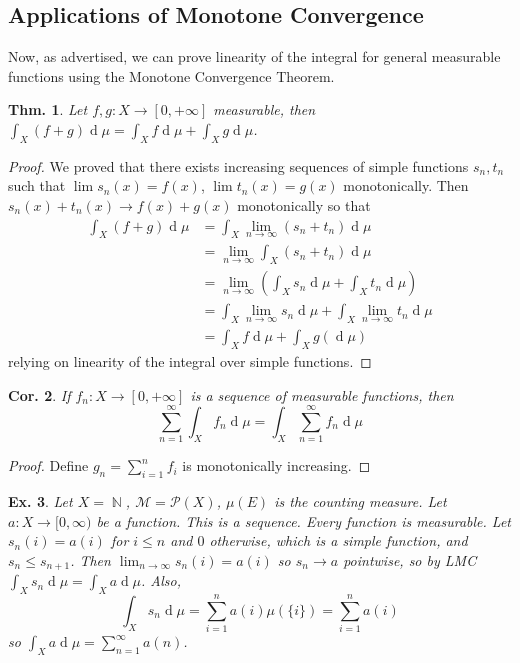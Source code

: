 \documentclass[12pt, a4paper]{book}
\DeclareMathOperator{\N}{\mathbb{N}}
\renewcommand{\d}[1]{\ensuremath{\operatorname{d}\!{#1}}} %
\newtheorem{theorem}{Thm.}[section]
\newtheorem{corollary}[theorem]{Cor.}
\newtheorem{example}[theorem]{Ex.}
\theoremstyle{nonumberplain}
\newtheorem{proof}{Proof}
\begin{document}
\subsection{Applications of Monotone Convergence}
Now, as advertised, we can prove linearity of the integral for general measurable functions using the Monotone Convergence Theorem.
\begin{theorem}
    Let $f,g:X\to[0,+\infty]$ measurable, then $\int_X(f+g)\d{\mu}=\int_X f\d{\mu}+\int_X g\d{\mu}$.
\end{theorem}
\begin{proof}
    We proved that there exists increasing sequences of simple functions $s_n,t_n$ such that $\lim s_n(x)=f(x)$, $\lim t_n(x)=g(x)$ monotonically.
    Then $s_n(x)+t_n(x)\to f(x)+g(x)$ monotonically so that
    \begin{align*}
        \int_X(f+g)\d{\mu} &= \int_X \lim_{n\to\infty}(s_n+t_n)\d{\mu}\\
                           &= \lim_{n\to\infty}\int_X (s_n+t_n)\d{\mu}\\
                           &= \lim_{n\to\infty}\left(\int_X s_n\d{\mu}+\int_X t_n\d{\mu}\right)\\
                           &= \int_X \lim_{n\to\infty}s_n\d{\mu}+\int_X\lim_{n\to\infty} t_n\d{\mu}\\
                           &= \int_X f\d{\mu}+\int_X g(\d{\mu})
    \end{align*}
    relying on linearity of the integral over simple functions.
\end{proof}
\begin{corollary}
    If $f_n:X\to[0,+\infty]$ is a sequence of measurable functions, then
    \[\sum_{n=1}^\infty \int_X f_n\d{\mu}=\int_X\sum\limits_{n=1}^\infty f_n\d{\mu}\]
\end{corollary}
\begin{proof}
    Define $g_n=\sum_{i=1}^n f_i$ is monotonically increasing.
\end{proof}
\begin{example}
    Let $X=\N$, $\mathcal{M}=\mathcal{P}(X)$, $\mu(E)$ is the counting measure.
    Let $a:X\to[0,\infty)$ be a function. %
    This is a sequence.
    Every function is measurable.
    Let $s_n(i)=a(i)$ for $i\leq n$ and $0$ otherwise, which is a simple function, and $s_n\leq s_{n+1}$.
    Then $\lim_{n\to\infty}s_n(i)=a(i)$ so $s_n\to a$ pointwise, so by LMC $\int_X s_n\d{\mu}=\int_X a\d{\mu}$.
    Also,
    \[\int_X s_n\d{\mu}=\sum\limits_{i=1}^na(i)\mu(\{i\})=\sum\limits_{i=1}^na(i)\]
    so $\int_X a\d{\mu}=\sum\limits_{n=1}^\infty a(n)$.
\end{example}
\end{document}

